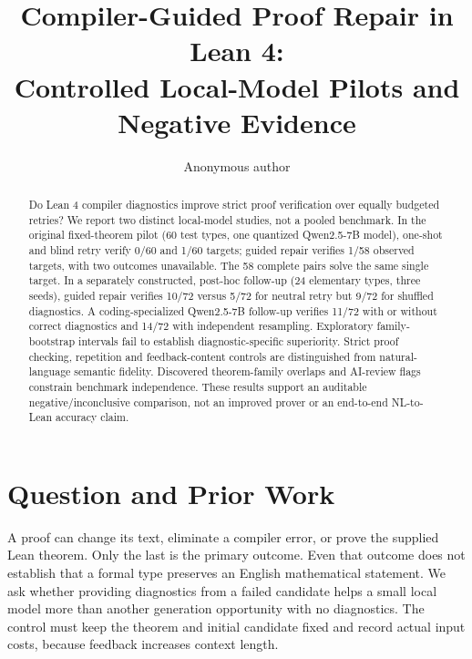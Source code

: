 \documentclass[runningheads,a4paper]{llncs}
\begin{document}
\title{Compiler-Guided Proof Repair in Lean 4:\\Controlled Local-Model Pilots and Negative Evidence}
\author{Anonymous author}
\maketitle
\begin{abstract}
Do Lean 4 compiler diagnostics improve strict proof verification over equally
budgeted retries? We report two distinct local-model studies, not a pooled
benchmark. In the original fixed-theorem pilot (60 test types, one quantized
Qwen2.5-7B model), one-shot and blind retry verify 0/60 and 1/60 targets;
guided repair verifies 1/58 observed targets, with two outcomes unavailable.
The 58 complete pairs solve the same single target. In a separately constructed,
post-hoc follow-up (24 elementary types, three seeds), guided repair verifies
10/72 versus 5/72 for neutral retry but 9/72 for shuffled diagnostics.
A coding-specialized Qwen2.5-7B follow-up verifies 11/72 with or without
correct diagnostics and 14/72 with independent resampling. Exploratory
family-bootstrap intervals fail to establish diagnostic-specific superiority.
Strict proof checking, repetition and feedback-content controls are distinguished
from natural-language semantic fidelity. Discovered theorem-family overlaps
and AI-review flags constrain benchmark independence. These results support an
auditable negative/inconclusive comparison, not an improved prover or an
end-to-end NL-to-Lean accuracy claim.
\end{abstract}

\section{Question and Prior Work}
A proof can change its text, eliminate a compiler error, or prove the supplied
Lean theorem. Only the last is the primary outcome. Even that outcome does not
establish that a formal type preserves an English mathematical statement.
We ask whether providing diagnostics from a failed candidate helps a small
local model more than another generation opportunity with no diagnostics.
The control must keep the theorem and initial candidate fixed and record
actual input costs, because feedback increases context length.
\end{document}
